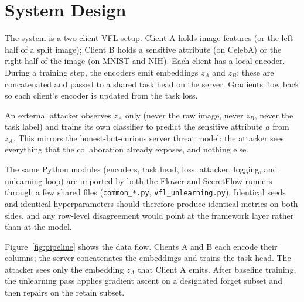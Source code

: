 \documentclass[sigconf,anonymous]{acmart}
\begin{document}
\section{System Design}

The system is a two-client VFL setup. Client A holds image features (or the left half of a split image); Client B holds a sensitive attribute (on CelebA) or the right half of the image (on MNIST and NIH). Each client has a local encoder. During a training step, the encoders emit embeddings $z_A$ and $z_B$; these are concatenated and passed to a shared task head on the server. Gradients flow back so each client's encoder is updated from the task loss.

An external attacker observes $z_A$ only (never the raw image, never $z_B$, never the task label) and trains its own classifier to predict the sensitive attribute $a$ from $z_A$. This mirrors the honest-but-curious server threat model: the attacker sees everything that the collaboration already exposes, and nothing else.

The same Python modules (encoders, task head, loss, attacker, logging, and unlearning loop) are imported by both the Flower and SecretFlow runners through a few shared files (\texttt{common\_*.py}, \texttt{vfl\_unlearning.py}). Identical seeds and identical hyperparameters should therefore produce identical metrics on both sides, and any row-level disagreement would point at the framework layer rather than at the model.

Figure~\ref{fig:pipeline} shows the data flow. Clients A and B each encode their columns; the server concatenates the embeddings and trains the task head. The attacker sees only the embedding $z_A$ that Client A emits. After baseline training, the unlearning pass applies gradient ascent on a designated forget subset and then repairs on the retain subset.
\end{document}
